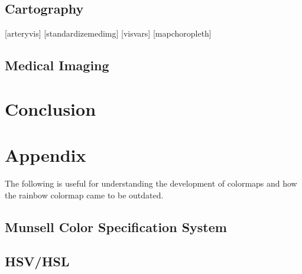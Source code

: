 \documentclass[journal]{IEEEtran}
\begin{document}
\subsection{Cartography}

[arteryvis]
[standardizemedimg]
[visvars]
[mapchoropleth]

\subsection{Medical Imaging}

\section{Conclusion}
\blindtext[1]

\ifCLASSOPTIONcaptionsoff
  \newpage
\fi

\section{Appendix}

The following is useful for understanding the development of 
colormaps and how the rainbow colormap came to be outdated.

\subsection{Munsell Color Specification System}

\subsection{HSV/HSL}
\end{document}
